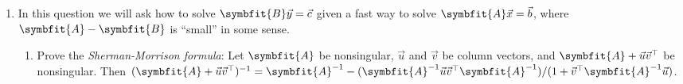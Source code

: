\documentclass{article}
\theoremstyle{definition}
\newcommand{\mat}[1]{\symbfit{#1}}
\newtheorem{lemma}{Lemma}
\begin{document}
\begin{enumerate}[leftmargin=\labelsep]
	      \begin{lemma}\label{lem:eigenvalsLLT}
		      If \(\vec{v}\) is an eigenvector of \(\mat{L}\mat{L}^\top\), with \(\lambda\) its eigenvalue, then \(\lambda\) is an eigenvalue of \(\mat{L}^\top\mat{L}\), with eigenvector \(\mat{L}^\top \vec{v}\).
	      \end{lemma}
	      \begin{proof}
		      We have
		      \begin{alignat}{4}
			               &  & \mat{L}\mat{L}^\top \vec{v}                          & = \lambda \vec{v} \label{eq:eigenval}         \\
			      \implies &  & \qty(\mat{L}^\top\mat{L}) \qty(\mat{L}^\top \vec{v}) & = \lambda \qty(\mat{L}^\top\vec{v}).\nonumber
		      \end{alignat}
		      For \(\vec{v}\not\in\ker(\mat{L}^\top)\). Suppose for contradiction that \(\vec{v}\in\ker(\mat{L}^\top)\). Then \cref{eq:eigenval} is
		      \[
			      \mat{L}\underbrace{\mat{L}^\top \vec{v}}_{=0} = \lambda \vec{v} \implies \lambda = 0,
		      \]
		      which is absurd since the eigenvalues of a positive definite matrix are non-zero. Thus, we have \(\vec{v}\not\in\ker(\mat{L}^\top)\), and so \(\lambda\) is always an eigenvalue of \(\mat{L}^\top\mat{L}\).
	      \end{proof}

	\item In this question we will ask how to solve \(\mat{B}\vec{y} = \vec{c}\) given a fast way to solve \(\mat{A}\vec{x} = \vec{b}\), where \(\mat{A} - \mat{B}\) is ``small'' in some sense.
	      \begin{enumerate}
		      \item Prove the \emph{Sherman-Morrison formula}: Let \(\mat{A}\) be nonsingular, \(\vec{u}\) and \(\vec{v}\) be column vectors, and \(\mat{A} + \vec{u}\vec{v}^\top\) be nonsingular. Then \((\mat{A} + \vec{u}\vec{v}^\top)^{-1} = \mat{A}^{-1} - (\mat{A}^{-1}\vec{u}\vec{v}^\top\mat{A}^{-1})/(1 + \vec{v}^\top \mat{A}^{-1} \vec{u})\). \label{item:sherman-morrison}


\end{enumerate}
\end{enumerate}
\end{document}
